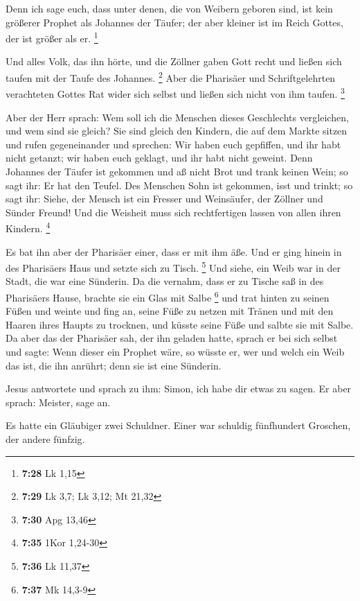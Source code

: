  Denn ich sage euch, dass unter denen, die von Weibern
geboren sind, ist kein größerer Prophet als Johannes der Täufer; der
aber kleiner ist im Reich Gottes, der ist größer als er. \footnote{\textbf{7:28}
  Lk 1,15}

 Und alles Volk, das ihn hörte, und die Zöllner gaben
Gott recht und ließen sich taufen mit der Taufe des Johannes.
\footnote{\textbf{7:29} Lk 3,7; Lk 3,12; Mt 21,32}  Aber
die Pharisäer und Schriftgelehrten verachteten Gottes Rat wider sich
selbst und ließen sich nicht von ihm taufen. \footnote{\textbf{7:30} Apg
  13,46}

 Aber der Herr sprach: Wem soll ich die Menschen dieses
Geschlechts vergleichen, und wem sind sie gleich?  Sie
sind gleich den Kindern, die auf dem Markte sitzen und rufen
gegeneinander und sprechen: Wir haben euch gepfiffen, und ihr habt nicht
getanzt; wir haben euch geklagt, und ihr habt nicht geweint.
 Denn Johannes der Täufer ist gekommen und aß nicht Brot
und trank keinen Wein; so sagt ihr: Er hat den Teufel. 
Des Menschen Sohn ist gekommen, isst und trinkt; so sagt ihr: Siehe, der
Mensch ist ein Fresser und Weinsäufer, der Zöllner und Sünder Freund!
 Und die Weisheit muss sich rechtfertigen lassen von
allen ihren Kindern. \footnote{\textbf{7:35} 1Kor 1,24-30}

 Es bat ihn aber der Pharisäer einer, dass er mit ihm
äße. Und er ging hinein in des Pharisäers Haus und setzte sich zu Tisch.
\footnote{\textbf{7:36} Lk 11,37}  Und siehe, ein Weib
war in der Stadt, die war eine Sünderin. Da die vernahm, dass er zu
Tische saß in des Pharisäers Hause, brachte sie ein Glas mit Salbe
\footnote{\textbf{7:37} Mk 14,3-9}  und trat hinten zu
seinen Füßen und weinte und fing an, seine Füße zu netzen mit Tränen und
mit den Haaren ihres Haupts zu trocknen, und küsste seine Füße und
salbte sie mit Salbe.  Da aber das der Pharisäer sah, der
ihn geladen hatte, sprach er bei sich selbst und sagte: Wenn dieser ein
Prophet wäre, so wüsste er, wer und welch ein Weib das ist, die ihn
anrührt; denn sie ist eine Sünderin.

 Jesus antwortete und sprach zu ihm: Simon, ich habe dir
etwas zu sagen. Er aber sprach: Meister, sage an.

 Es hatte ein Gläubiger zwei Schuldner. Einer war
schuldig fünfhundert Groschen, der andere fünfzig.

